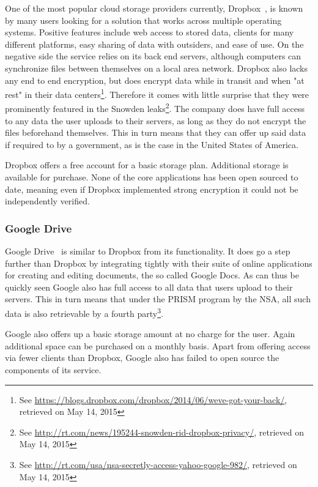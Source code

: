 One of the most popular cloud storage providers currently, Dropbox~\cite{web:site:dropbox}, is known by many users looking for a solution that works across multiple operating systems.
Positive features include web access to stored data, clients for many different platforms, easy sharing of data with outsiders, and ease of use.
On the negative side the service relies on its back end servers, although computers can synchronize files between themselves on a local area network.
Dropbox also lacks any end to end encryption, but does encrypt data while in transit and when "at rest" in their data centers\footnote{See \url{https://blogs.dropbox.com/dropbox/2014/06/weve-got-your-back/}, retrieved on May 14, 2015}.
Therefore it comes with little surprise that they were prominently featured in the Snowden leaks\footnote{See \url{http://rt.com/news/195244-snowden-rid-dropbox-privacy/}, retrieved on May 14, 2015}.
The company does have full access to any data the user uploads to their servers, as long as they do not encrypt the files beforehand themselves.
This in turn means that they can offer up said data if required to by a government, as is the case in the United States of America.

Dropbox offers a free account for a basic storage plan.
Additional storage is available for purchase.
None of the core applications has been open sourced to date, meaning even if Dropbox implemented strong encryption it could not be independently verified.

\subsubsection{Google Drive}

Google Drive~\cite{web:site:gdrive} is similar to Dropbox from its functionality.
It does go a step further than Dropbox by integrating tightly with their suite of online applications for creating and editing documents, the so called Google Docs.
As can thus be quickly seen Google also has full access to all data that users upload to their servers.
This in turn means that under the PRISM program by the NSA, all such data is also retrievable by a fourth party\footnote{See \url{http://rt.com/usa/nsa-secretly-access-yahoo-google-982/}, retrieved on May 14, 2015}.

Google also offers up a basic storage amount at no charge for the user.
Again additional space can be purchased on a monthly basis.
Apart from offering access via fewer clients than Dropbox, Google also has failed to open source the components of its service.

